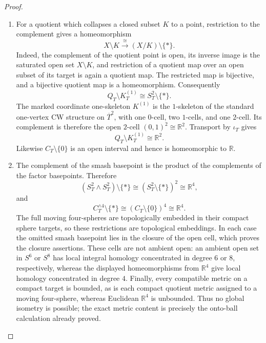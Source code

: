 \begin{proof}
\begin{enumerate}[label=\arabic*.,leftmargin=*]
\item For a quotient which collapses a closed subset \(K\) to a point, restriction
to the complement gives a homeomorphism
\[
 X\setminus K\xrightarrow{\ \cong\ }(X/K)\setminus\{*\}.
\]
Indeed, the complement of the quotient point is open, its inverse image is
the saturated open set \(X\setminus K\), and restriction of a quotient map
over an open subset of its target is again a quotient map.  The restricted
map is bijective, and a bijective quotient map is a homeomorphism.
Consequently
\[
 Q_T\setminus K_T^{(1)}
 \cong S_T^2\setminus\{*\}.
\]
The marked coordinate one-skeleton \(K^{(1)}\) is the \(1\)-skeleton of the
standard one-vertex CW structure on \(\overline T^2\), with one \(0\)-cell,
two \(1\)-cells, and one \(2\)-cell.  Its complement is therefore the open
\(2\)-cell \((0,1)^2\cong\mathbb R^2\).  Transport by
\(\iota_T\) gives
\[
 Q_T\setminus K_T^{(1)}\cong\mathbb R^2.
\]
Likewise \(C_T\setminus\{0\}\) is an open interval and hence is homeomorphic
to \(\mathbb R\).

\item The complement of the smash basepoint is the product of the complements of
the factor basepoints.  Therefore
\[
 (S_T^2\wedge S_T^2)\setminus\{*\}
 \cong(S_T^2\setminus\{*\})^2\cong\mathbb R^4,
\]
and
\[
 C_T^{\wedge4}\setminus\{*\}
 \cong(C_T\setminus\{0\})^4\cong\mathbb R^4.
\]
The full moving four-spheres are topologically embedded in their compact
sphere targets, so these restrictions are topological embeddings.  In each
case the omitted smash basepoint lies in the closure of the open cell, which
proves the closure assertions. These cells are not ambient open: an ambient open set in $S^6$ or $S^8$ has local integral homology concentrated in degree $6$ or $8$, respectively, whereas the displayed homeomorphisms from $\mathbb R^4$ give local homology concentrated in degree $4$. Finally, every compatible metric on a
compact target is bounded, as is each compact quotient metric assigned to a
moving four-sphere, whereas Euclidean \(\mathbb R^4\) is unbounded.  Thus no
global isometry is possible; the exact metric content is precisely the
onto-ball calculation already proved.
\end{enumerate}
\end{proof}


